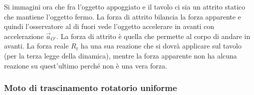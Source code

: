 \documentclass[10pt,a4paper]{book}
\begin{document}
\begin{figure}[htpb]
\end{figure}
\FloatBarrier
Si immagini ora che fra l'oggetto appoggiato e il tavolo ci sia un attrito statico che mantiene l'oggetto fermo. La forza di attrito bilancia la forza apparente e quindi l'osservatore al di fuori vede l'oggetto accelerare in avanti con accelerazione $\vec{a}_{O'}$. La forza di attrito è quella che permette al corpo di andare in avanti. La forza reale $R_t$ ha una sua reazione che si dovrà applicare sul tavolo (per la terza legge della dinamica), mentre la forza apparente non ha alcuna reazione su quest'ultimo perché non è una vera forza.

\subsubsection{Moto di trascinamento rotatorio uniforme}
\end{document}

